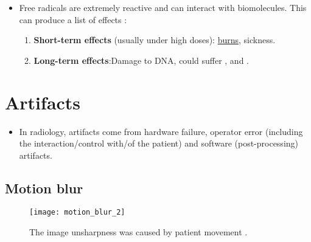 \begin{itemize}
\item Free radicals are extremely reactive and can interact with
  biomolecules. This can produce a list of effects
  \cite{bushberg2011essential}:
  \begin{enumerate}
  \item \textbf{Short-term effects} (usually under high doses):
    \href{https://en.wikipedia.org/wiki/Radiation_burn}{burns},
    sickness.
  \item \textbf{Long-term effects}:Damage to DNA, could suffer
    , and .
  \end{enumerate}
\end{itemize}

\section{Artifacts}
\begin{itemize}
\item In radiology, artifacts come from hardware failure, operator
  error (including the interaction/control with/of the patient) and
  software (post-processing) artifacts.
\end{itemize}

\newpage
\subsection*{Motion blur}
\vspace{-1ex}
\begin{figure}[H]
  \centering
  \texttt{[image: motion\_blur\_2]}
  \caption{The image unsharpness was caused by patient movement
    \cite{radiology_key}.\label{fig:motion_blur}}
\end{figure}

\newpage
